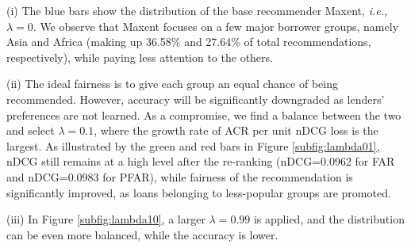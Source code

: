 (i) The blue bars show the distribution of the base recommender Maxent, \emph{i.e.,} $\lambda=0$. We observe that Maxent focuses on a few major borrower groups, namely Asia and Africa (making up 36.58\% and 27.64\% of total recommendations, respectively), while paying less attention to the others. 

(ii) The ideal fairness is to give each group an equal chance of being recommended. However, accuracy will be significantly downgraded as lenders' preferences are not learned. As a compromise, we find a balance between the two and select $\lambda=0.1$, where the growth rate of ACR per unit nDCG loss is the largest. As illustrated by the green and red bars in Figure \ref{subfig:lambda01}, nDCG still remains at a high level after the re-ranking (nDCG=0.0962 for FAR and nDCG=0.0983 for PFAR), while fairness of the recommendation is significantly improved, as loans belonging to less-popular groups are promoted.

(iii) In Figure \ref{subfig:lambda10}, a larger $\lambda=0.99$ is applied, and the distribution can be even more balanced, while the accuracy is lower.




